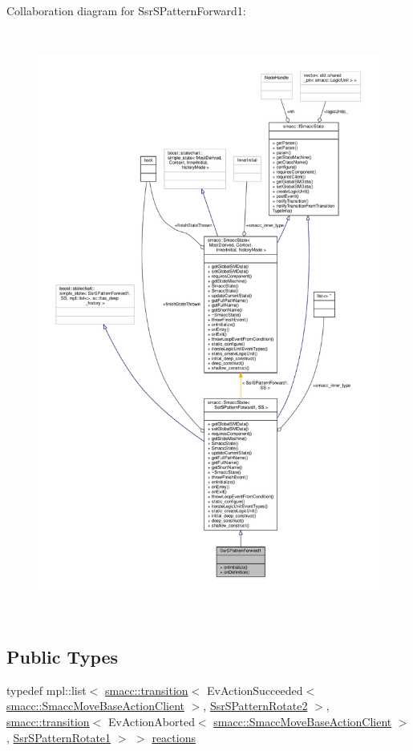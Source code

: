 Collaboration diagram for Ssr\+S\+Pattern\+Forward1\+:
\nopagebreak
\begin{figure}[H]
\begin{center}
\leavevmode
\includegraphics[height=550pt]{structSsrSPatternForward1__coll__graph}
\end{center}
\end{figure}
\subsection*{Public Types}
\begin{DoxyCompactItemize}
\item 
typedef mpl\+::list$<$ \hyperlink{classsmacc_1_1transition}{smacc\+::transition}$<$ Ev\+Action\+Succeeded$<$ \hyperlink{classsmacc_1_1SmaccMoveBaseActionClient}{smacc\+::\+Smacc\+Move\+Base\+Action\+Client} $>$, \hyperlink{structSsrSPatternRotate2}{Ssr\+S\+Pattern\+Rotate2} $>$, \hyperlink{classsmacc_1_1transition}{smacc\+::transition}$<$ Ev\+Action\+Aborted$<$ \hyperlink{classsmacc_1_1SmaccMoveBaseActionClient}{smacc\+::\+Smacc\+Move\+Base\+Action\+Client} $>$, \hyperlink{structSsrSPatternRotate1}{Ssr\+S\+Pattern\+Rotate1} $>$ $>$ \hyperlink{structSsrSPatternForward1_a1717ab1af0fa7fae0ad608d6eac1b919}{reactions}
\end{DoxyCompactItemize}
